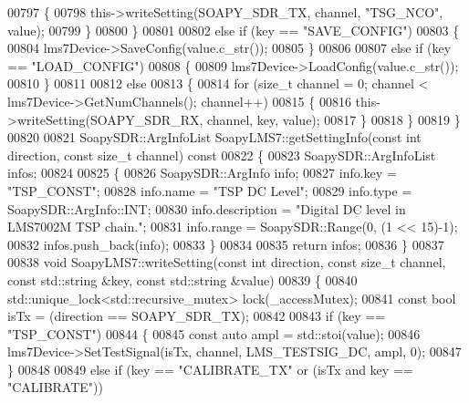 \begin{DoxyCode}
{{{{{{{{{{{{{{00797         \{
00798             this->writeSetting(SOAPY_SDR_TX, channel, \textcolor{stringliteral}{"TSG\_NCO"}, value);
00799         \}
00800     \}
00801 
00802     \textcolor{keywordflow}{else} \textcolor{keywordflow}{if} (key == \textcolor{stringliteral}{"SAVE\_CONFIG"})
00803     \{
00804         lms7Device->SaveConfig(value.c\_str());
00805     \}
00806 
00807     \textcolor{keywordflow}{else} \textcolor{keywordflow}{if} (key == \textcolor{stringliteral}{"LOAD\_CONFIG"})
00808     \{
00809         lms7Device->LoadConfig(value.c\_str());
00810     \}
00811 
00812     \textcolor{keywordflow}{else}
00813     \{
00814         \textcolor{keywordflow}{for} (\textcolor{keywordtype}{size\_t} channel = 0; channel < lms7Device->GetNumChannels(); channel++)
00815         \{
00816             this->writeSetting(SOAPY_SDR_RX, channel, key, value);
00817         \}
00818     \}
00819 \}
00820 
00821 SoapySDR::ArgInfoList SoapyLMS7::getSettingInfo(\textcolor{keyword}{const} \textcolor{keywordtype}{int} direction, \textcolor{keyword}{const} \textcolor{keywordtype}{size\_t} channel)\textcolor{keyword}{ const}
00822 \textcolor{keyword}{}\{
00823     SoapySDR::ArgInfoList infos;
00824 
00825     \{
00826         SoapySDR::ArgInfo info;
00827         info.key = \textcolor{stringliteral}{"TSP\_CONST"};
00828         info.name = \textcolor{stringliteral}{"TSP DC Level"};
00829         info.type = SoapySDR::ArgInfo::INT;
00830         info.description = \textcolor{stringliteral}{"Digital DC level in LMS7002M TSP chain."};
00831         info.range = SoapySDR::Range(0, (1 << 15)-1);
00832         infos.push\_back(info);
00833     \}
00834 
00835     \textcolor{keywordflow}{return} infos;
00836 \}
00837 
00838 \textcolor{keywordtype}{void} SoapyLMS7::writeSetting(\textcolor{keyword}{const} \textcolor{keywordtype}{int} direction, \textcolor{keyword}{const} \textcolor{keywordtype}{size\_t} channel, \textcolor{keyword}{const} 
      std::string &key, \textcolor{keyword}{const} std::string &value)
00839 \{
00840     std::unique\_lock<std::recursive\_mutex> lock(_accessMutex);
00841     \textcolor{keyword}{const} \textcolor{keywordtype}{bool} isTx = (direction == SOAPY_SDR_TX);
00842 
00843     \textcolor{keywordflow}{if} (key == \textcolor{stringliteral}{"TSP\_CONST"})
00844     \{
00845         \textcolor{keyword}{const} \textcolor{keyword}{auto} ampl = std::stoi(value);
00846         lms7Device->SetTestSignal(isTx, channel, LMS_TESTSIG_DC, ampl, 0);
00847     \}
00848 
00849     \textcolor{keywordflow}{else} \textcolor{keywordflow}{if} (key == \textcolor{stringliteral}{"CALIBRATE\_TX"} or (isTx and key == \textcolor{stringliteral}{"CALIBRATE"}))
}}}}}}}}}}}}}}
\end{DoxyCode}
